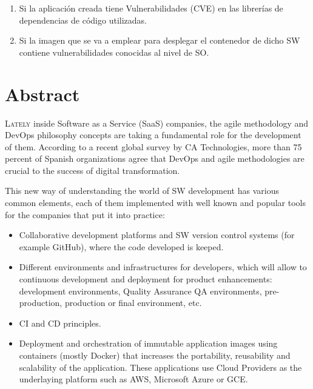 \begin{enumerate}
	\item Si la aplicación creada tiene Vulnerabilidades (\gls{CVE}\cite{cve2017}) en las librerías de dependencias de código utilizadas.
	\item Si la imagen que se va a emplear para desplegar el contenedor de dicho \gls{SW} contiene vulnerabilidades conocidas al nivel de \gls{SO}.
\end{enumerate}

\chapter*{Abstract}
\pagestyle{especial}
{}

\lettrine[lraise=-0.1, lines=2, loversize=0.2]{L}{ately} inside Software as a Service (\gls{SaaS}) companies, the agile methodology and \gls{DevOps} philosophy concepts are taking a fundamental role for the development of them\cite{consultorit2017}. According to a recent global survey by CA Technologies, more than 75 percent of Spanish organizations agree that DevOps and agile methodologies are crucial to the success of digital transformation\cite{catechnologies2017}.

This new way of understanding the world of \gls{SW} development has various common elements, each of them implemented with well known and popular tools for the companies that put it into practice:

\begin{itemize}
\item Collaborative development platforms and \gls{SW} version control systems (for example GitHub\cite{github2017}), where the code developed is keeped.
\item Different environments and infrastructures for developers, which will allow to continuous development and deployment for product enhancements: development environments, Quality Assurance \gls{QA} environments, pre-production, production or final environment, etc.
\item \gls{CI} and \gls{CD} principles.
\item Deployment and orchestration of immutable application images using containers (mostly Docker) that increases the portability, reusability and scalability of the application. These applications use Cloud Providers as the underlaying platform such as \gls{AWS}\cite{aws2017}, Microsoft Azure\cite{azure2017} or \gls{GCE}\cite{google2017}.
\end{itemize}

